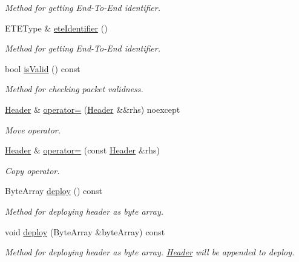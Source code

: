 \begin{DoxyCompactItemize}
\begin{DoxyCompactList}\small\item\em Method for getting End-\/\+To-\/\+End identifier. \end{DoxyCompactList}\item 
E\+T\+E\+Type \& \hyperlink{classDiameter_1_1Packet_1_1Header_a7c560309887342069e4c8cd5548e7259}{ete\+Identifier} ()
\begin{DoxyCompactList}\small\item\em Method for getting End-\/\+To-\/\+End identifier. \end{DoxyCompactList}\item 
bool \hyperlink{classDiameter_1_1Packet_1_1Header_acddf8e84f63f81e44b3b7f0108e7528c}{is\+Valid} () const
\begin{DoxyCompactList}\small\item\em Method for checking packet validness. \end{DoxyCompactList}\item 
\hyperlink{classDiameter_1_1Packet_1_1Header}{Header} \& \hyperlink{classDiameter_1_1Packet_1_1Header_ae863a0e3740a82b3418494cfa15f4530}{operator=} (\hyperlink{classDiameter_1_1Packet_1_1Header}{Header} \&\&rhs) noexcept
\begin{DoxyCompactList}\small\item\em Move operator. \end{DoxyCompactList}\item 
\hyperlink{classDiameter_1_1Packet_1_1Header}{Header} \& \hyperlink{classDiameter_1_1Packet_1_1Header_a20db71c8a57453bcd9cbdbf796bf84b1}{operator=} (const \hyperlink{classDiameter_1_1Packet_1_1Header}{Header} \&rhs)
\begin{DoxyCompactList}\small\item\em Copy operator. \end{DoxyCompactList}\item 
Byte\+Array \hyperlink{classDiameter_1_1Packet_1_1Header_a49c18e76b6aadb478efc9a592323b5a3}{deploy} () const
\begin{DoxyCompactList}\small\item\em Method for deploying header as byte array. \end{DoxyCompactList}\item 
void \hyperlink{classDiameter_1_1Packet_1_1Header_ae60b1ea0904d4d6bb98a7e5b8cbb5d11}{deploy} (Byte\+Array \&byte\+Array) const
\begin{DoxyCompactList}\small\item\em Method for deploying header as byte array. \hyperlink{classDiameter_1_1Packet_1_1Header}{Header} will be appended to deploy. \end{DoxyCompactList}\end{DoxyCompactItemize}
